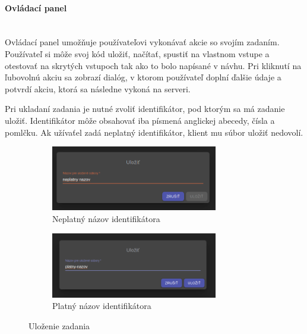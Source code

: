 \paragraph{Ovládací panel}\leavevmode\\
Ovládací panel umožňuje používateľovi vykonávať akcie so svojím zadaním. Používateľ si môže svoj kód
uložiť, načítať, spustiť na vlastnom vstupe a otestovať na skrytých vstupoch tak ako to bolo 
napísané v návhu. Pri kliknutí na ľubovolnú akciu sa zobrazí dialóg, v ktorom používateľ doplní
ďalšie údaje a potvrdí akciu, ktorá sa následne vykoná na serveri.

Pri ukladaní zadania je nutné zvoliť identifikátor, pod ktorým sa má zadanie uložiť. Identifikátor
môže obsahovať iba písmená anglickej abecedy, čísla a pomlčku. Ak užívaťel zadá neplatný 
identifikátor, klient mu súbor uložiť nedovolí.
\begin{figure}[H]
\centering
\begin{subfigure}{.5\textwidth}
  \centering
  \includegraphics[width=0.8\textwidth]{images/neplatny_nazov}
  \caption[Neplatný názov identifikátora]{Neplatný názov identifikátora}
  \label{obr:neplatny_nazov}
\end{subfigure}%
\begin{subfigure}{.5\textwidth}
  \centering
  \includegraphics[width=0.8\textwidth]{images/platny_nazov}
  \caption[Platný názov identifikátora]{Platný názov identifikátora}
  \label{obr:platny_nazov}
\end{subfigure}
\caption{Uloženie zadania}
\end{figure}

